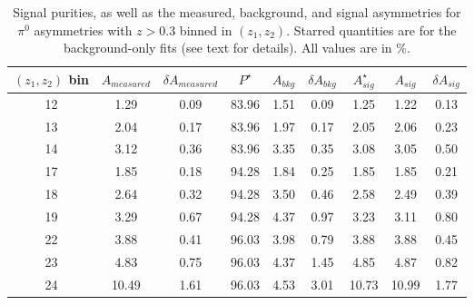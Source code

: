 \begin{table}[H]\footnotesize
\centering
\begin{tabular}{|c|c|c|c|c|c|c|c|c|}
\hline
$(z_{1},z_{2})$ bin & $A_{measured}$ & $\delta A_{measured}$ & $P^{\star}$ & $A_{bkg}$ & $\delta A_{bkg}$ & $A_{sig}^{\star}$ & $ A_{sig}$  & $\delta A_{sig}$ \\ \hline\hline
12 & 1.29 & 0.09 & 83.96 & 1.51 & 0.09 & 1.25 & 1.22 & 0.13 \\ \hline 
13 & 2.04 & 0.17 & 83.96 & 1.97 & 0.17 & 2.05 & 2.06 & 0.23 \\ \hline 
14 & 3.12 & 0.36 & 83.96 & 3.35 & 0.35 & 3.08 & 3.05 & 0.50 \\ \hline \hline
17 & 1.85 & 0.18 & 94.28 & 1.84 & 0.25 & 1.85 & 1.85 & 0.21 \\ \hline 
18 & 2.64 & 0.32 & 94.28 & 3.50 & 0.46 & 2.58 & 2.49 & 0.39 \\ \hline 
19 & 3.29 & 0.67 & 94.28 & 4.37 & 0.97 & 3.23 & 3.11 & 0.80 \\ \hline \hline
22 & 3.88 & 0.41 & 96.03 & 3.98 & 0.79 & 3.88 & 3.88 & 0.45 \\ \hline 
23 & 4.83 & 0.75 & 96.03 & 4.37 & 1.45 & 4.85 & 4.87 & 0.82 \\ \hline 
24 & 10.49 & 1.61 & 96.03 & 4.53 & 3.01 & 10.73 & 10.99 & 1.77 \\ \hline 
\end{tabular}
\caption[BG-correction quantities for $\pi^0$ asymmetries with $z>0.3$, $(z_1,z_2)$ bins]{Signal purities, as well as the measured, background, and signal asymmetries for $\pi^0$ asymmetries with $z>0.3$ binned in $(z_1,z_2)$. Starred quantities are for the background-only fits (see text for details). All values are in \%.}
\label{tab:pi0comzbkgcor}
\end{table} 

